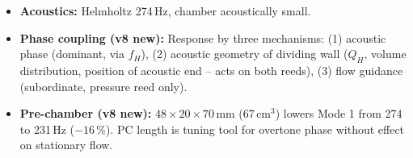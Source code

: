 \documentclass[11pt,a4paper]{article}
\begin{document}
\begin{itemize}[leftmargin=5mm, itemsep=3pt]
\item \textbf{Acoustics:} Helmholtz 274\,Hz, chamber acoustically small.

\item \textbf{Phase coupling (v8 new):} Response by three mechanisms: (1) acoustic phase (dominant, via $f_H$), (2) acoustic geometry of dividing wall ($Q_H$, volume distribution, position of acoustic end -- acts on both reeds), (3) flow guidance (subordinate, pressure reed only).

\item \textbf{Pre-chamber (v8 new):} $48 \times 20 \times 70$\,mm (67\,cm$^3$) lowers Mode 1 from 274 to 231\,Hz ($-16\,\%$). PC length is tuning tool for overtone phase without effect on stationary flow.
\end{itemize}
\end{document}
